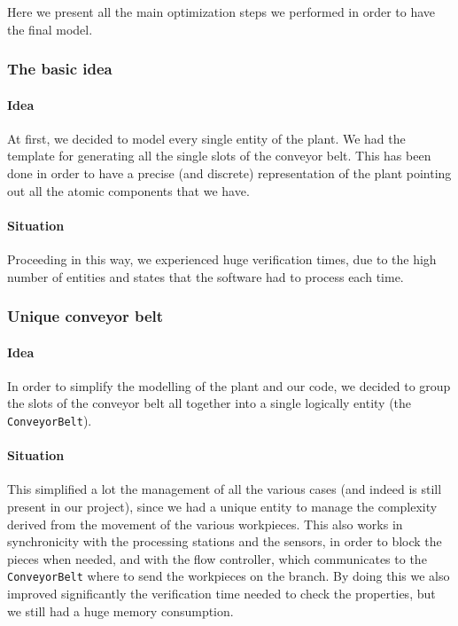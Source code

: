 \documentclass[a4paper]{article}
\begin{document}
    Here we present all the main optimization steps we performed in order to have the final model.

    \subsubsection{The basic idea}

    \paragraph{Idea} At first, we decided to model every single entity of the plant. We had the template for generating all the single slots of the conveyor belt. This has been done in order to have a precise (and discrete) representation of the plant pointing out all the atomic components that we have.

    \paragraph{Situation} Proceeding in this way, we experienced huge verification times, due to the high number of entities and states that the software had to process each time.

    \subsubsection{Unique conveyor belt}

    \paragraph{Idea} In order to simplify the modelling of the plant and our code, we decided to group the slots of the conveyor belt all together into a single logically entity (the \texttt{ConveyorBelt}).

    \paragraph{Situation} This simplified a lot the management of all the various cases (and indeed is still present in our project), since we had a unique entity to manage the complexity derived from the movement of the various workpieces. This also works in synchronicity with the processing stations and the sensors, in order to block the pieces when needed, and with the flow controller, which communicates to the \texttt{ConveyorBelt} where to send the workpieces on the branch. By doing this we also improved significantly the verification time needed to check the properties, but we still had a huge memory consumption.
\end{document}
